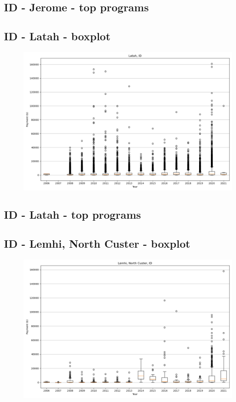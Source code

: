 \subsection*{ID - Jerome - top programs}

\newpage
\subsection*{ID - Latah - boxplot}
\begin{figure}[h]
\centering
\includegraphics[width=7in]{../output/boxplots/counties/Latah-ID_boxplot.png}
\end{figure}


\subsection*{ID - Latah - top programs}

\newpage
\subsection*{ID - Lemhi, North Custer - boxplot}
\begin{figure}[h]
\centering
\includegraphics[width=7in]{../output/boxplots/counties/Lemhi, North Custer-ID_boxplot.png}
\end{figure}


